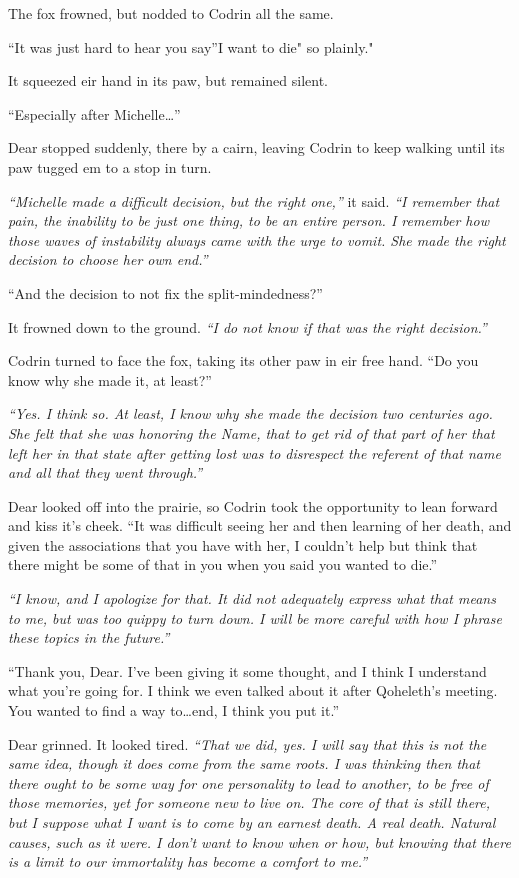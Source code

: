 The fox frowned, but nodded to Codrin all the same.

``It was just hard to hear you say''I want to die" so plainly."

It squeezed eir hand in its paw, but remained silent.

``Especially after Michelle\ldots{}''

Dear stopped suddenly, there by a cairn, leaving Codrin to keep walking until its paw tugged em to a stop in turn.

\emph{``Michelle made a difficult decision, but the right one,''} it said. \emph{``I remember that pain, the inability to be just one thing, to be an entire person. I remember how those waves of instability always came with the urge to vomit. She made the right decision to choose her own end.''}

``And the decision to not fix the split-mindedness?''

It frowned down to the ground. \emph{``I do not know if that was the right decision.''}

Codrin turned to face the fox, taking its other paw in eir free hand. ``Do you know why she made it, at least?''

\emph{``Yes. I think so. At least, I know why she made the decision two centuries ago. She felt that she was honoring the Name, that to get rid of that part of her that left her in that state after getting lost was to disrespect the referent of that name and all that they went through.''}

Dear looked off into the prairie, so Codrin took the opportunity to lean forward and kiss it's cheek. ``It was difficult seeing her and then learning of her death, and given the associations that you have with her, I couldn't help but think that there might be some of that in you when you said you wanted to die.''

\emph{``I know, and I apologize for that. It did not adequately express what that means to me, but was too quippy to turn down. I will be more careful with how I phrase these topics in the future.''}

``Thank you, Dear. I've been giving it some thought, and I think I understand what you're going for. I think we even talked about it after Qoheleth's meeting. You wanted to find a way to\ldots end, I think you put it.''

Dear grinned. It looked tired. \emph{``That we did, yes. I will say that this is not the same idea, though it does come from the same roots. I was thinking then that there ought to be some way for one personality to lead to another, to be free of those memories, yet for someone new to live on. The core of that is still there, but I suppose what I want is to come by an earnest death. A real death. Natural causes, such as it were. I don't want to know when or how, but knowing that there is a limit to our immortality has become a comfort to me.''}

